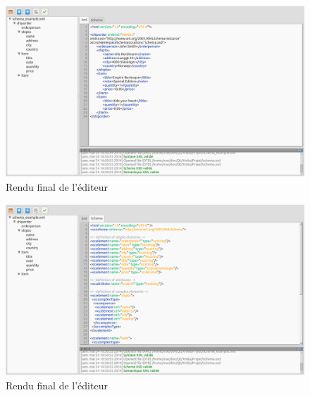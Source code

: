 \begin{figure}[h!]
\begin{minipage}[b]{\linewidth}
\centering \includegraphics[scale=0.3]{images/final.png}
\caption{Rendu final de l'éditeur}
\label{final}
\end{minipage}
\end{figure}
\begin{figure}[h!]
\begin{minipage}[b]{\linewidth}
\centering \includegraphics[scale=0.3]{images/final_xsd.png}
\caption{Rendu final de l'éditeur}
\label{final_xsd}
\end{minipage}
\end{figure}
